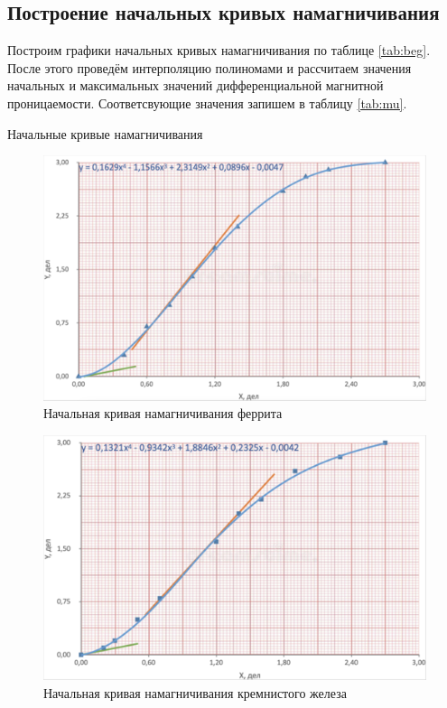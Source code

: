 \documentclass[12pt,a4paper]{article}
\begin{document}
\subsection*{Построение начальных кривых намагничивания}

Построим графики начальных кривых намагничивания по таблице \ref{tab:beg}. После этого проведём интерполяцию полиномами и рассчитаем значения начальных и максимальных значений дифференциальной магнитной проницаемости. Соответсвующие значения запишем в таблицу \ref{tab:mu}. 

\begin{table}[H]
    \caption{Начальные кривые намагничивания}
    
	\label{tab:beg}
\end{table}

\begin{figure}[h!]
	\centering
	\includegraphics[width = 12 cm]{src/fer.png}
	\caption{Начальная кривая намагничивания феррита}
\end{figure}
\begin{figure}[h!]
	\centering
	\includegraphics[width = 12 cm]{src/sil.png}
	\caption{Начальная кривая намагничивания кремнистого железа}
\end{figure}
\end{document}
